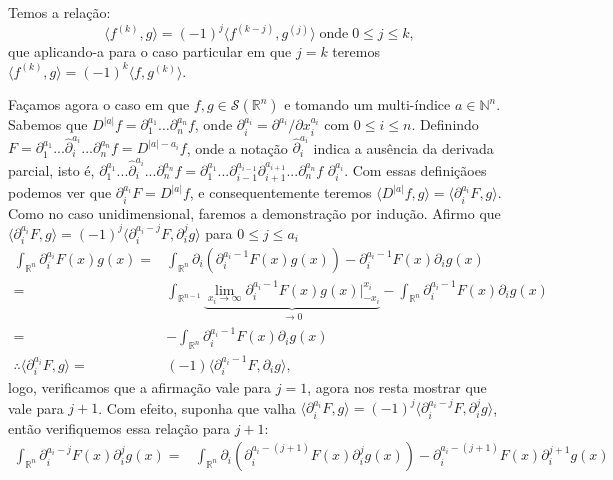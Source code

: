 \documentclass{article}
\begin{document}
\begin{enumerate}
		Temos a relação: 
		$$
		\langle f^{(k)},g \rangle = (-1)^{j}\langle f^{(k-j)},g^{(j)} \rangle \; \text{onde} \; 0 \leq j \leq k,
		$$
		que aplicando-a para o caso particular em que $j = k$ teremos $\langle f^{(k)},g \rangle = (-1)^{k}\langle f,g^{(k)} \rangle$.
		
		Façamos agora o caso em que $f, g \in \mathcal{S}(\mathbb{R}^{n})$ e tomando um multi-índice $a \in \mathbb{N}^{n}$. Sabemos que $D^{|a|}f = \partial^{a_{1}}_{1} \dots \partial^{a_{n}}_{n} f$, onde $\partial^{a_{i}}_{i}  = \partial^{a_{i}}/\partial x^{a_{i}}_{i}$ com $0\leq i \leq n$. Definindo $F = \partial^{a_{1}}_{1}... \hat{\partial}^{a_{i}}_{i}...\partial^{a_{n}}_{n}f = D^{|a|-a_{i}}f$, onde a notação $\hat{\partial}^{a_{i}}_{i}$ indica a ausência da derivada parcial, isto é, $\partial^{a_{1}}_{1}... \hat{\partial}^{a_{i}}_{i}...\partial^{a_{n}}_{n}f = \partial^{a_{1}}_{1}... \partial^{a_{i-1}}_{i-1}\partial^{a_{i+1}}_{i+1}...\partial^{a_{n}}_{n}f$ $\partial^{a_{i}}_{i}$. Com essas definiçãoes podemos ver que $\partial^{a_{i}}_{i}F = D^{|a|}f$, e consequentemente teremos $\langle D^{|a|}f, g \rangle =\langle \partial^{a_{i}}_{i}F, g \rangle$. Como no caso unidimensional, faremos a demonstração por indução. Afirmo que $\langle \partial^{a_{i}}_{i}F, g \rangle = (-1)^{j} \langle \partial^{a_{i}-j}_{i}F, \partial^{j}_{i}g \rangle$ para $0 \leq j \leq a_{i}$
		$$
		\begin{aligned}
		\int_{\mathbb{R}^{n}}\partial^{a_{i}}_{i}F(x)g(x) = & \int_{\mathbb{R}^{n}} \partial_{i}(\partial^{a_{i}-1}_{i}F(x)g(x)) -  \partial^{a_{i}-1}_{i}F(x) \partial_{i}g(x)
		\\
		= & \int_{\mathbb{R}^{n-1}} \underbrace{ \lim_{x_{i} \to \infty}\partial^{a_{i}-1}_{i}F(x)g(x) \Big|^{x_{i}}_{-x_{i}} }_{\to 0} -  \int_{\mathbb{R}^{n}} \partial^{a_{i}-1}_{i}F(x) \partial_{i}g(x)
		\\
		= & - \int_{\mathbb{R}^{n}}\partial^{a_{i}-1}_{i}F(x) \partial_{i}g(x)
		\\
		\therefore \langle \partial^{a_{i}}_{i}F, g \rangle = & (-1)\langle \partial^{a_{i}-1}_{i}F, \partial_{i}g \rangle,
		\end{aligned}
		$$
		logo, verificamos que a afirmação vale para $j=1$, agora nos resta mostrar que vale para $j+1$. Com efeito, suponha que valha $\langle \partial^{a_{i}}_{i}F, g \rangle = (-1)^{j} \langle \partial^{a_{i}-j}_{i}F, \partial^{j}_{i}g \rangle$, então verifiquemos essa relação para $j+1$:
		$$
		\begin{aligned}
		\int_{\mathbb{R}^{n}}\partial^{a_{i}-j}_{i}F(x) \partial^{j}_{i}g(x) = & \int_{\mathbb{R}^{n}} \partial_{i}(\partial^{a_{i}-(j+1)}_{i}F(x)\partial^{j}_{i}g(x)) -  \partial^{a_{i}-(j+1)}_{i}F(x) \partial^{j+1}_{i}g(x)

\end{aligned}$$
\end{enumerate}
\end{document}
